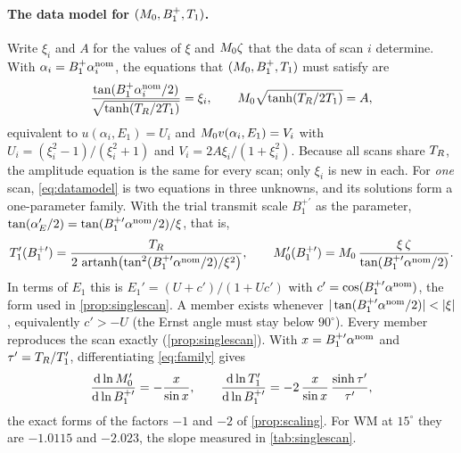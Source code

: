 \paragraph{The data model for $(M_0,B_1^{+},T_1)$.} Write $\xi_i$ and $A$ for the values of $\xi$
and $M_0\zeta$ that the data of scan $i$ determine. With $\alpha_i=B_1^{+}\alpha_i^{\rm nom}$, the equations
that $(M_0,B_1^{+},T_1)$ must satisfy are
\begin{equation}
  \frac{\tan(B_1^{+}\alpha_i^{\rm nom}/2)}{\sqrt{\tanh(T_R/2T_1)}}=\xi_i,\qquad
  M_0\sqrt{\tanh(T_R/2T_1)}=A ,
  \label{eq:datamodel}
\end{equation}
equivalent to $u(\alpha_i,E_1)=U_i$ and $M_0 v(\alpha_i,E_1)=V_i$ with $U_i=(\xi_i^2-1)/(\xi_i^2+1)$ and
$V_i=2A\xi_i/(1+\xi_i^2)$. Because all scans share $T_R$, the amplitude equation is the same for every
scan; only $\xi_i$ is new in each. For \emph{one} scan, \eqref{eq:datamodel} is two equations in three
unknowns, and its solutions form a one-parameter family. With the trial transmit scale
$B_1^{+\prime}$ as the parameter, $\tan(\alpha_E'/2)=\tan(B_1^{+\prime}\alpha^{\rm nom}/2)/\xi$, that is,
\begin{equation}
  T_1'(B_1^{+\prime})=\frac{T_R}{2\,\operatorname{artanh}\bigl(\tan^2(B_1^{+\prime}\alpha^{\rm nom}/2)/\xi^2\bigr)},\qquad
  M_0'(B_1^{+\prime})=M_0\,\frac{\xi\,\zeta}{\tan(B_1^{+\prime}\alpha^{\rm nom}/2)} .
  \label{eq:family}
\end{equation}
In terms of $E_1$ this is $E_1'=(U+c')/(1+Uc')$ with $c'=\cos(B_1^{+\prime}\alpha^{\rm nom})$, the form used in
\cref{prop:singlescan}. A member exists whenever $|\tan(B_1^{+\prime}\alpha^{\rm nom}/2)|<|\xi|$, equivalently
$c'>-U$ (the Ernst angle must stay below $90^\circ$). Every member reproduces the scan exactly
(\cref{prop:singlescan}). With $x=B_1^{+\prime}\alpha^{\rm nom}$ and $\tau'=T_R/T_1'$, differentiating \eqref{eq:family} gives
\begin{equation}
  \frac{\mathrm d\ln M_0'}{\mathrm d\ln B_1^{+\prime}}=-\frac{x}{\sin x},\qquad
  \frac{\mathrm d\ln T_1'}{\mathrm d\ln B_1^{+\prime}}=-2\,\frac{x}{\sin x}\,\frac{\sinh\tau'}{\tau'},
  \label{eq:familyslopes}
\end{equation}
the exact forms of the factors $-1$ and $-2$ of \cref{prop:scaling}. For WM at $15^\circ$ they are
$-1.0115$ and $-2.023$, the slope measured in \cref{tab:singlescan}.

